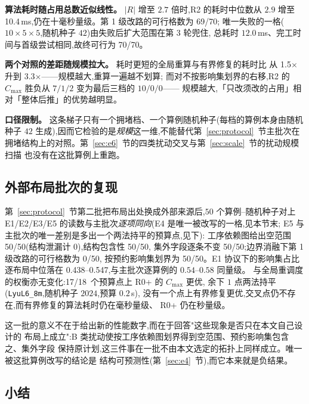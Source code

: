 \documentclass[manuscript,screen,review]{acmart}
\newcommand{\NPubPairs}{50}
\newcommand{\PubPassMiss}{\NPubPairs/\NPubPairs}
\newcommand{\PubFeasRone}{0/\NPubPairs}
\newcommand{\PubFeasRtwo}{\NPubPairs/\NPubPairs}
\newcommand{\PubPassClosed}{\NPubPairs/\NPubPairs}
\newcommand{\PubPassInvar}{\NPubPairs/\NPubPairs}
\newcommand{\PubEoneFracLo}{0.438}
\newcommand{\PubEoneFracHi}{0.547}
\newcommand{\PubEfiveNoCross}{17/18}
\newcommand{\ScalePairs}{70}
\newcommand{\ScaleMsHi}{10.4}        %
\newcommand{\ScaleRatioLo}{1.5}      %
\newcommand{\ScaleRatioHi}{3.3}      %
\newcommand{\ScaleFeasFirst}{69/\ScalePairs}   %
\newcommand{\ScaleFeasAll}{\ScalePairs/\ScalePairs}
\begin{document}
\textbf{算法耗时随占用总数近似线性。} \(|R|\) 增至 \(2.7\) 倍时,R2 的耗时中位数从
\(2.9\) 增至 \ScaleMsHi\,ms,仍在十毫秒量级。第 1 级改路的可行格数为 \ScaleFeasFirst;
唯一失败的一格(\(10\times5\times5\),随机种子 \(42\))由失败后扩大范围在第 \(3\) 轮兜住,
总耗时 \(12.0\)\,ms、完工时间与首级尝试相同,故终可行为 \ScaleFeasAll。

\textbf{两个对照的差距随规模拉大。} 耗时更短的全局重算与有界修复的耗时比
从 \ScaleRatioLo\(\times\) 升到 \ScaleRatioHi\(\times\)——规模越大,重算一遍越不划算;
而对不按影响集划界的右移,R2 的 \(C_{\max}\) 胜负从 \(7/1/2\) 变为最后三档的 \(10/0/0\)——
规模越大,「只改须改的占用」相对「整体后推」的优势越明显。

\textbf{口径限制。} 这条梯子只有一个拥堵档、一个算例随机种子(每档的算例本身由随机种子
\(42\) 生成),因而它检验的是\emph{规模}这一维,不能替代第~\ref{sec:protocol}~节主批次在
拥堵结构上的对照。第~\ref{sec:e6}~节的四类扰动交叉与第~\ref{sec:scale}~节的扰动规模扫描
也没有在这批算例上重跑。

\subsection{外部布局批次的复现}
\label{sec:pubrepro}

第~\ref{sec:protocol}~节第二批把布局出处换成外部来源后,\(\NPubPairs\) 个算例--随机种子对上
E1/E2/E3/E5 的读数与主批次\emph{逐项同向}(E4 是唯一被改写的一格,见本节末;
E5 与主批次的唯一差别是多出一个两法持平的预算点,见下):
工序依赖图给出空范围 \PubPassMiss(结构泄漏计 \(0\)),结构包含性 \PubPassClosed,
集外字段逐条不变 \PubPassInvar;边界消融下第 1 级改路的可行格数为 \PubFeasRone,
按预约影响集划界为 \PubFeasRtwo。E1 协议下的影响集占比逐布局中位落在
\PubEoneFracLo--\PubEoneFracHi,与主批次逐算例的 \(0.54\)--\(0.58\) 同量级。
与全局重调度的权衡亦无变化:\PubEfiveNoCross\ 个预算点上 R0+ 的 \(C_{\max}\) 更优,
余下 \(1\) 点两法持平(\texttt{LyuL6\_8m},随机种子 \(2024\),预算 \(0.2\)\,s),
没有一个点上有界修复更优,交叉点仍不存在,而有界修复的算法耗时仍在毫秒量级、
R0+ 仍在秒量级。

这一批的意义不在于给出新的性能数字,而在于回答"这些现象是否只在本文自己设计的
布局上成立":B 类扰动使按工序依赖图划界得到空范围、预约影响集包含之、集外字段
保持原计划,这三件事在一批不由本文选定的拓扑上同样成立。唯一被这批算例改写的结论是
结构可预测性(第~\ref{sec:e4}~节),而它本来就是负结果。

\subsection{小结}
\label{sec:exp_summary}
\end{document}
